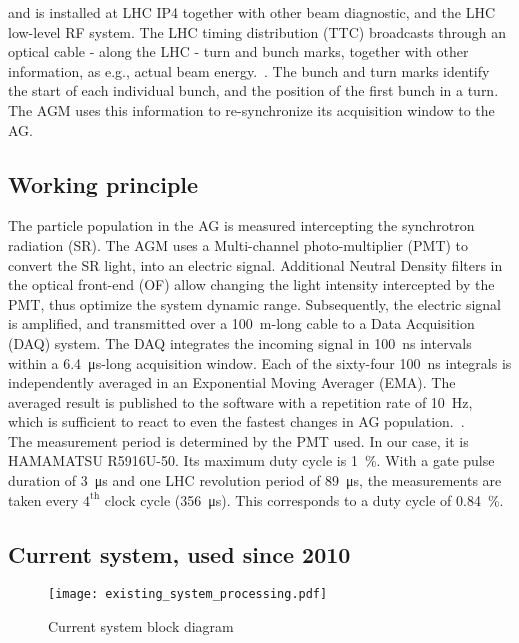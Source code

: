 %
and is installed at LHC IP4 together with other beam diagnostic, and the LHC low-level RF system.
%
The LHC timing distribution (TTC) broadcasts through an optical cable - along the LHC - turn and bunch marks, together with other information, as e.g., actual beam energy.~\cite{ttc_distribution}.
%
The bunch and turn marks identify the start of each individual bunch, and the position of the first bunch in a turn.   
%
The AGM uses this information to re-synchronize its acquisition window to the AG.
%
\subsection{Working principle}
%
The particle population in the AG is measured intercepting the synchrotron radiation (SR). 
%
The AGM uses a Multi-channel photo-multiplier (PMT) to convert the SR light, into an electric signal.
%
Additional Neutral Density filters in the optical front-end (OF) allow  changing the light intensity intercepted by the PMT, thus optimize the system dynamic range.
% 
Subsequently, the electric signal is amplified, and transmitted over a \SI{100}{m}-long cable to a Data Acquisition (DAQ) system.
%
The DAQ integrates the incoming signal in \SI{100}{\nano\second} intervals within a \SI{6.4}{\micro\second}-long acquisition window.
%
Each of the sixty-four \SI{100}{\nano\second} integrals is independently averaged in an Exponential Moving Averager (EMA).
%
The averaged result is published to the software with a repetition rate of 10~Hz, which is sufficient to react to even the fastest changes in AG population.~\cite{high_sensitivity_measurement}.
%
\\
The measurement period is determined by the PMT used.
%
In our case, it is HAMAMATSU R5916U-50. 
%
Its maximum duty cycle is \SI{1}{\%}. 
%
With a gate pulse duration of \SI{3}{\micro\second} and one LHC revolution period of \SI{89}{\micro\second}, the measurements are taken every $4^{\text{th}}$ clock cycle (\SI{356}{\micro\second}).
%
This corresponds to a duty cycle of \SI{0.84}{\%}.
\\
%

\subsection{Current system, used since 2010}
\begin{figure}[!tbh]
    \centering
    \texttt{[image: existing\_system\_processing.pdf]}
    \caption{Current system block diagram}
    \label{fig:current_system_processing}
\end{figure}

